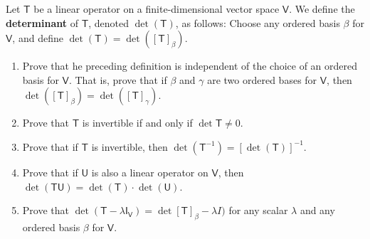 Let $\mathsf{T}$ be a linear operator on a finite-dimensional vector
space $\mathsf{V}$. We define the {\bf determinant} of $\mathsf{T}$,
denoted $\det{(\mathsf{T})}$, as follows: Choose any ordered basis
$\beta$ for $\mathsf{V}$, and define $\det{(\mathsf{T})}=
\det{([\mathsf{T}]_\beta )}$.
\begin{enumerate}
\item Prove that he preceding definition is independent of the choice
  of an ordered basis for $\mathsf{V}$. That is, prove that if $\beta$
  and $\gamma$ are two ordered bases for $\mathsf{V}$, then $\det{([\mathsf{T}]_\beta)}=\det{([\mathsf{T}]_\gamma)}$.
\item Prove that $\mathsf{T}$ is invertible if and only if
  $\det{\mathsf{T}}\neq 0$.
\item Prove that if $\mathsf{T}$ is invertible, then
  $\det{(\mathsf{T}^{-1})}= [\det{(\mathsf{T})}]^{-1}$.
\item Prove that if $\mathsf{U}$ is also a linear operator on
  $\mathsf{V}$, then $\det{(\mathsf{TU})} = \det{(\mathsf{T})}\cdot\det{(\mathsf{U})}$.
\item Prove that $\det{(\mathsf{T}-\lambda \mathsf{I}_\mathsf{V})} =
    \det{[\mathsf{T}]_\beta -\lambda I)}$ for any scalar $\lambda$ and
      any ordered basis $\beta$ for $\mathsf{V}$.
\end{enumerate}
